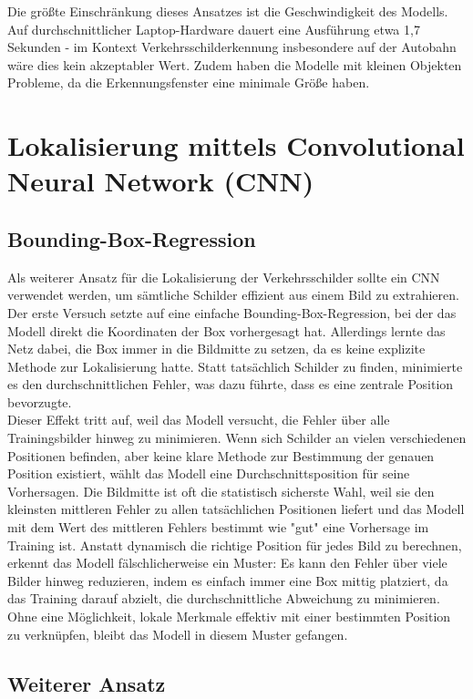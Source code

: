 \documentclass[runningheads]{llncs}
\begin{document}
Die größte Einschränkung dieses Ansatzes ist die Geschwindigkeit des Modells. Auf durchschnittlicher Laptop-Hardware dauert eine Ausführung etwa 1,7 Sekunden - im Kontext Verkehrsschilderkennung insbesondere auf der Autobahn wäre dies kein akzeptabler Wert. Zudem haben die Modelle mit kleinen Objekten Probleme, da die Erkennungsfenster eine minimale Größe haben.

\section{Lokalisierung mittels Convolutional Neural Network (CNN)}

\subsection{Bounding-Box-Regression}
Als weiterer Ansatz für die Lokalisierung der Verkehrsschilder sollte ein CNN verwendet
werden, um sämtliche Schilder effizient aus einem Bild zu extrahieren.
Der erste Versuch setzte auf eine einfache Bounding-Box-Regression, bei der das Modell
direkt die Koordinaten der Box vorhergesagt hat. Allerdings lernte das Netz dabei, die
Box immer in die Bildmitte zu setzen, da es keine explizite Methode zur Lokalisierung hatte. Statt tatsächlich Schilder zu finden, minimierte es den durchschnittlichen Fehler, was dazu führte, dass es eine zentrale Position bevorzugte.
\\
Dieser Effekt tritt auf, weil das Modell versucht, die Fehler über alle Trainingsbilder
hinweg zu minimieren. Wenn sich Schilder an vielen verschiedenen Positionen befinden,
aber keine klare Methode zur Bestimmung der genauen Position existiert, wählt das
Modell eine Durchschnittsposition für seine Vorhersagen. Die Bildmitte ist oft die
statistisch sicherste Wahl, weil sie den kleinsten mittleren Fehler zu allen tatsächlichen
Positionen liefert und das Modell mit dem Wert des mittleren Fehlers bestimmt wie "gut"
eine Vorhersage im Training ist. Anstatt dynamisch die richtige Position für jedes Bild
zu berechnen,
erkennt das Modell fälschlicherweise ein Muster:
Es kann den Fehler über viele Bilder hinweg reduzieren, indem es einfach immer eine
Box mittig platziert, da das Training darauf abzielt, die durchschnittliche
Abweichung zu minimieren. Ohne eine Möglichkeit, lokale Merkmale effektiv mit einer
bestimmten Position zu verknüpfen, bleibt das Modell
in diesem Muster gefangen.

\subsection{Weiterer Ansatz}
\end{document}
